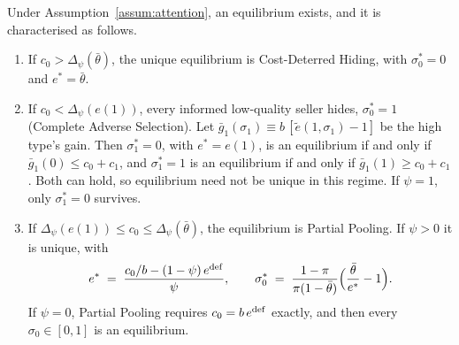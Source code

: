\label{prop:att_equilibrium}
Under Assumption~\ref{assum:attention}, an equilibrium exists, and it is characterised as follows.
\begin{enumerate}[label=(\roman*)]
    \item If $c_0>\Delta_\psi(\bar\theta)$, the unique equilibrium is Cost-Deterred Hiding, with $\sigma_0^*=0$ and $e^*=\bar\theta$.
    \item If $c_0<\Delta_\psi(e(1))$, every informed low-quality seller hides, $\sigma_0^*=1$ (Complete Adverse Selection). Let $\bar g_1(\sigma_1)\equiv b\,[\tilde e(1,\sigma_1)-1]$ be the high type's gain. Then $\sigma_1^*=0$, with $e^*=e(1)$, is an equilibrium if and only if $\bar g_1(0)\le c_0+c_1$, and $\sigma_1^*=1$ is an equilibrium if and only if $\bar g_1(1)\ge c_0+c_1$. Both can hold, so equilibrium need not be unique in this regime. If $\psi=1$, only $\sigma_1^*=0$ survives.
    \item If $\Delta_\psi(e(1))\le c_0\le\Delta_\psi(\bar\theta)$, the equilibrium is Partial Pooling. If $\psi>0$ it is unique, with
    \begin{equation}
        e^*\;=\;\frac{c_0/b-(1-\psi)\,e^{\rm def}}{\psi},\qquad \sigma_0^*\;=\;\frac{1-\pi}{\pi(1-\bar\theta)}\Big(\frac{\bar\theta}{e^*}-1\Big).
        \label{eq:att_pp}
    \end{equation}
    If $\psi=0$, Partial Pooling requires $c_0=b\,e^{\rm def}$ exactly, and then every $\sigma_0\in[0,1]$ is an equilibrium.
\end{enumerate}

